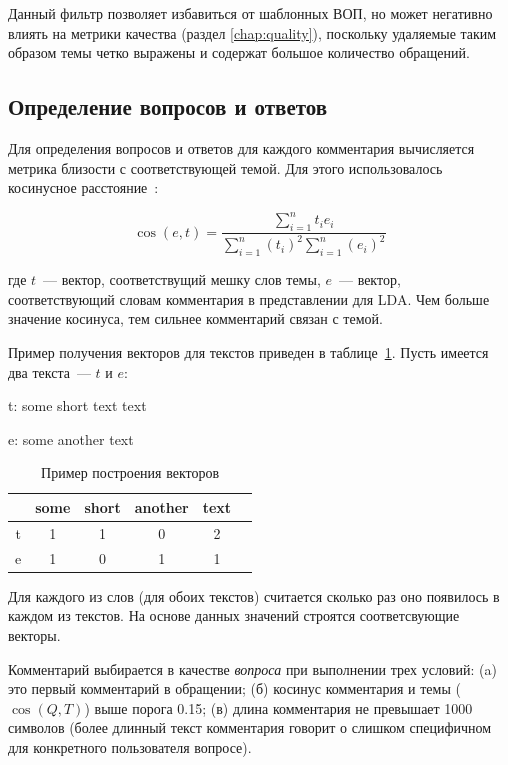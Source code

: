 Данный фильтр позволяет избавиться от шаблонных ВОП, но может негативно влиять на метрики качества (раздел \ref{chap:quality}), поскольку удаляемые таким образом темы четко выражены и содержат большое количество обращений.

\subsection{Определение вопросов и ответов}
\label{subsec:findqa}

Для определения вопросов и ответов для каждого комментария вычисляется метрика близости с соответствующей темой. Для этого использовалось косинусное расстояние~\cite{cosine}: 

\begin{equation}\label{}
\cos(e, t)=\frac{\sum_{i=1}^nt_ie_i}{\sum_{i=1}^n(t_i)^2\sum_{i=1}^n(e_i)^2}
\end{equation}

где $t$~--- вектор, соответствущий мешку слов темы, $e$~--- вектор, соответствующий словам комментария в представлении для LDA. Чем больше значение косинуса, тем сильнее комментарий связан с темой.

Пример получения векторов для текстов приведен в таблице~\ref{text_vect}. Пусть имеется два текста~--- $t$ и $e$:

\begin{itemize*}
\item t: some short text text
\item e: some another text
\end{itemize*}

\begin{table}[!ht]
\caption{Пример построения векторов}
\label{text_vect}
\centering
\begin{tabular}{|c|c|c|c|c|c|}
\hline
 & some & short & another & text \\
\hline
t & 1 & 1 & 0 & 2\\
\hline
e & 1 & 0 & 1 & 1\\
\hline
\end{tabular}
\end{table}

Для каждого из слов (для обоих текстов) считается сколько раз оно появилось в каждом из текстов. На основе данных значений строятся соответсвующие векторы.

Комментарий выбирается в качестве \textit{вопроса} при выполнении трех условий: (a) это первый комментарий в обращении; (б) косинус комментария и темы ($\cos(Q,T)$) выше порога 0.15; (в) длина комментария не превышает 1000 символов (более длинный текст комментария говорит о слишком специфичном для конкретного пользователя вопросе).

